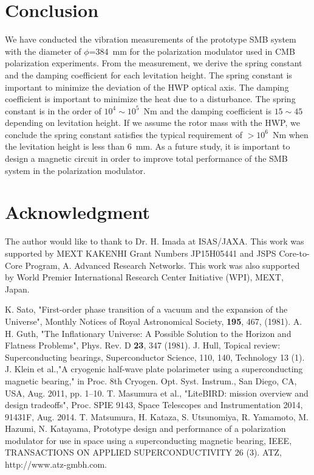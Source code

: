 \documentclass[a4paper]{jpconf}
\begin{document}
\section*{Conclusion}
We have conducted the vibration measurements of the prototype SMB system with the diameter of $\phi$=384~mm for the polarization modulator used in CMB polarization experiments.
From the measurement, we derive the spring constant and the damping coefficient for each levitation height.
The spring constant is important to minimize the deviation of the HWP optical axis.
The damping coefficient is important to minimize the heat due to a disturbance.
The spring constant is in the order of $10^{4} \sim 10^{5}$~Nm and the damping coefficient is $15\sim45$ depending on levitation height.
If we assume the rotor mass with the HWP, we conclude the spring constant satisfies the typical requirement of $> 10^{6}$~Nm when the levitation height is less than 6~mm.
As a future study, it is important to design a magnetic circuit in order to improve total performance of the SMB system in the polarization modulator.

\section*{Acknowledgment}
The author would like to thank to Dr. H. Imada at ISAS/JAXA.
This work was supported by MEXT KAKENHI Grant Numbers JP15H05441 and JSPS Core-to-Core Program, A. Advanced Research Networks.
This work was also supported by World Premier International Research Center Initiative (WPI), MEXT, Japan.


\vspace*{5mm}
\begin{thebibliography}{99}

 K. Sato, "First-order phase transition of a vacuum and the expansion of the Universe", Monthly Notices of Royal Astronomical Society, {\bf 195}, 467, (1981).
A. H. Guth, "The Inflationary Universe: A Possible Solution to the Horizon and Flatness Problems", Phys. Rev. D {\bf 23}, 347 (1981).
J. Hull, Topical review: Superconducting bearings, Superconductor Science, 110, 140, Technology 13 (1).
J. Klein et al.,"A cryogenic half-wave plate polarimeter using a superconducting magnetic bearing," in Proc. 8th Cryogen. Opt. Syst. Instrum., San Diego, CA, USA, Aug. 2011, pp. 1–10.
T. Masumura et al., "LiteBIRD: mission overview and design tradeoffs", Proc. SPIE 9143, Space Telescopes and Instrumentation 2014, 91431F, Aug. 2014.
T. Matsumura, H. Kataza, S. Utsunomiya, R. Yamamoto, M. Hazumi, N. Katayama, Prototype design and performance of a polarization modulator for use in space using a superconducting magnetic bearing, IEEE, TRANSACTIONS ON APPLIED SUPERCONDUCTIVITY 26 (3).
ATZ, http://www.atz-gmbh.com.
\end{thebibliography}
\end{document}
